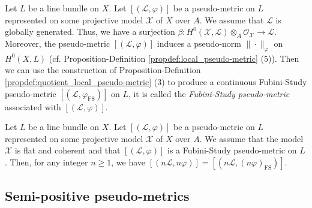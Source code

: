 \documentclass [11pt,reqno]{amsart}
\newcommand{\1}{\mathmybb{1}}
\def\cL{{\mathcal{L}}}
\def\cO{{\mathcal{O}}}
\def\cX{{\mathcal{X}}}
\def\FS{\operatorname{FS}}
\begin{document}
\begin{proposition-definition}
\label{propdef:Fubini-Study_operator_local_pseudo-metric}
Let $L$ be a line bundle on $X$. Let $[(\cL,\varphi)]$ be a pseudo-metric on $L$ represented on some projective model $\cX$ of $X$ over $A$. We assume that $\cL$ is globally generated. Thus, we have a surjection $\beta : H^{0}(\cX,\cL) \otimes_{A} \cO_{\cX} \to \cL$.  Moreover, the pseudo-metric $[(\cL,\varphi)]$ induces a pseudo-norm $\|\cdot\|_{\varphi}$ on $H^{0}(X,L)$ (cf. Proposition-Definition \ref{propdef:local_pseudo-metric} (5)). Then we can use the construction of Proposition-Definition \ref{propdef:quotient_local_pseudo-metric} (3) to produce a continuous Fubini-Study pseudo-metric $[(\cL,\varphi_{\FS})]$ on $L$, it is called the \emph{Fubini-Study pseudo-metric} associated with $[(\cL,\varphi)]$. 
\end{proposition-definition}

\begin{proposition}
\label{prop:CM_2.2.23}
Let $L$ be a line bundle on $X$. Let $[(\cL,\varphi)]$ be a pseudo-metric on $L$ represented on some projective model $\cX$ of $X$ over $A$. We assume that the model $\cX$ is flat and coherent and that $[(\cL,\varphi)]$ is a Fubini-Study pseudo-metric on $L$. Then, for any integer $n\geq 1$, we have $[(n\cL,n\varphi)]=[(n\cL,(n\varphi)_{\mathrm{FS}})]$.
\end{proposition}

\subsection{Semi-positive pseudo-metrics}
\label{sub:semi-positive_local}
\end{document}
